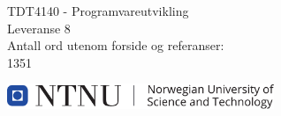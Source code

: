 \begin{titlepage}

    \begin{center}

        {\LARGE TDT4140 - Programvareutvikling\\[0.25em]Leveranse 8}
        \\[4em]

        {
        Antall ord utenom forside og referanser:
        \\1351
        }

        \vfill
        
        \includegraphics[width=8cm]{ntnu.pdf}
        
        
    \end{center}
    
    \thispagestyle{empty}
    \addtocounter{page}{-1}

\end{titlepage}
    
